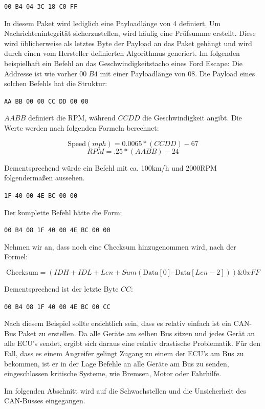 \documentclass[
    fontsize=12pt,
    headings=small,
    parskip=half,           %
    bibliography=totoc,9
    numbers=noenddot,       %
    open=any,               %
    ]{scrreprt}
\begin{document}
\centerline{\texttt{00 B4 04 3C 18 C0 FF}}

In diesem Paket wird lediglich eine Payloadlänge von 4 definiert. Um Nachrichtenintegrität sicherzustellen, wird häufig eine Prüfsumme erstellt. Diese wird üblicherweise als letztes Byte der Payload an das Paket gehängt und wird durch einen vom Hersteller definierten Algorithmus generiert.
Im folgenden beispielhaft ein Befehl an das Geschwindigkeitstacho eines Ford Escape:
Die Addresse ist wie vorher $00\;B4$ mit einer Payloadlänge von $08$. Die Payload eines solchen Befehls hat die Struktur:

\centerline{\texttt{AA BB 00 00 CC DD 00 00}}

$AA BB$ definiert die RPM, während $CC DD$ die Geschwindigkeit angibt. Die Werte werden nach folgenden Formeln berechnet:

\[\text{Speed} (mph) = 0.0065 * (CC DD) - 67\]
\[RPM = .25 * (AA BB) - 24\]

Dementsprechend würde ein Befehl mit ca. 100km/h und 2000RPM folgendermaßen aussehen.

\centerline{\texttt{1F 40 00 4E BC 00 00}}

Der komplette Befehl hätte die Form:

\centerline{\texttt{00 B4 08 1F 40 00 4E BC 00 00}}

Nehmen wir an, dass noch eine Checksum hinzugenommen wird, nach der Formel:

\[\text{Checksum} = (IDH + IDL + Len + Sum(\text{Data}[0] – \text{Data}[Len-2])) \& 0xFF \]

Dementsprechend ist der letzte Byte $CC$:

\centerline{\texttt{00 B4 08 1F 40 00 4E BC 00 CC}}

Nach diesem Beispiel sollte ersichtlich sein, dass es relativ einfach ist ein CAN-Bus Paket zu erstellen.
Da alle Geräte am selben Bus sitzen und jedes Gerät an alle ECU's sendet, ergibt sich daraus eine relativ drastische Problematik.
Für den Fall, dass es einem Angreifer gelingt Zugang zu einem der ECU's am Bus zu bekommen, ist er in der Lage Befehle an alle Geräte am Bus zu senden, eingeschlossen kritische Systeme, wie Bremsen, Motor oder Fahrhilfe.

Im folgenden Abschnitt wird auf die Schwachstellen und die Unsicherheit des CAN-Busses eingegangen.
\end{document}
